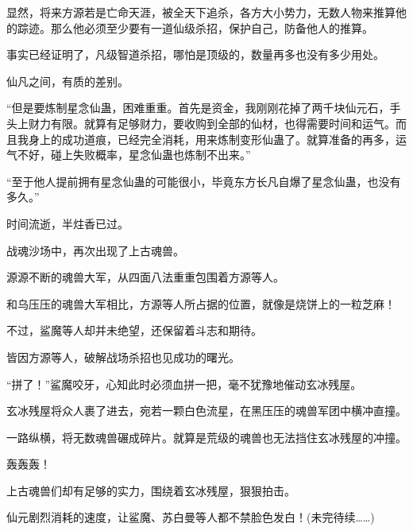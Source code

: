 \begin{this_body}
显然，将来方源若是亡命天涯，被全天下追杀，各方大小势力，无数人物来推算他的踪迹。那么他必须至少要有一道仙级杀招，保护自己，防备他人的推算。

事实已经证明了，凡级智道杀招，哪怕是顶级的，数量再多也没有多少用处。

仙凡之间，有质的差别。

“但是要炼制星念仙蛊，困难重重。首先是资金，我刚刚花掉了两千块仙元石，手头上财力有限。就算有足够财力，要收购到全部的仙材，也得需要时间和运气。而且我身上的成功道痕，已经完全消耗，用来炼制变形仙蛊了。就算准备的再多，运气不好，碰上失败概率，星念仙蛊也炼制不出来。”

“至于他人提前拥有星念仙蛊的可能很小，毕竟东方长凡自爆了星念仙蛊，也没有多久。”

时间流逝，半炷香已过。

战魂沙场中，再次出现了上古魂兽。

源源不断的魂兽大军，从四面八法重重包围着方源等人。

和乌压压的魂兽大军相比，方源等人所占据的位置，就像是烧饼上的一粒芝麻！

不过，鲨魔等人却并未绝望，还保留着斗志和期待。

皆因方源等人，破解战场杀招也见成功的曙光。

“拼了！”鲨魔咬牙，心知此时必须血拼一把，毫不犹豫地催动玄冰残屋。

玄冰残屋将众人裹了进去，宛若一颗白色流星，在黑压压的魂兽军团中横冲直撞。

一路纵横，将无数魂兽碾成碎片。就算是荒级的魂兽也无法挡住玄冰残屋的冲撞。

轰轰轰！

上古魂兽们却有足够的实力，围绕着玄冰残屋，狠狠拍击。

仙元剧烈消耗的速度，让鲨魔、苏白曼等人都不禁脸色发白！(未完待续……)

\end{this_body}

